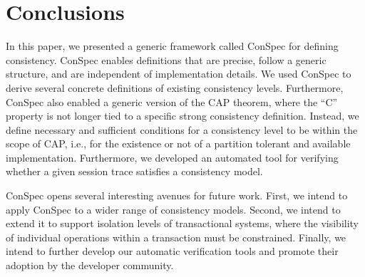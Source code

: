 \documentclass[journal,compsoc]{IEEEtran}
\begin{document}
\section{Conclusions}
In this paper, we presented a generic framework called ConSpec for defining consistency. ConSpec enables definitions that are precise, follow a generic structure, and are independent of implementation details. We used ConSpec to derive several concrete definitions of existing consistency levels. Furthermore, ConSpec also enabled a generic version of the CAP theorem, where the ``C'' property is not longer tied to a specific strong consistency definition. Instead, we define necessary and sufficient conditions for a consistency level to be within the scope of CAP, i.e., for the existence or not of a partition tolerant and available implementation.
Furthermore, we developed an automated tool for verifying whether a given session trace satisfies a consistency model. 

ConSpec opens several interesting avenues for future work. First, we intend to apply ConSpec to a wider range of consistency models. Second, we intend to extend it to support isolation levels of transactional systems, where the visibility of individual operations within a transaction must be constrained. Finally, we intend to further develop our automatic verification tools and promote their adoption by the developer community.


\end{document}
